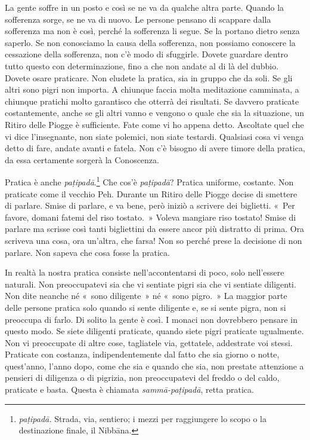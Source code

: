 La gente soffre in un posto e così se ne va da qualche altra parte.
Quando la sofferenza sorge, se ne va di nuovo. Le persone pensano di
scappare dalla sofferenza ma non è così, perché la sofferenza li segue.
Se la portano dietro senza saperlo. Se non conosciamo la causa della
sofferenza, non possiamo conoscere la cessazione della sofferenza, non
c'è modo di sfuggirle. Dovete guardare dentro tutto questo con
determinazione, fino a che non andate al di là del dubbio. Dovete osare
praticare. Non eludete la pratica, sia in gruppo che da soli. Se gli
altri sono pigri non importa. A chiunque faccia molta meditazione
camminata, a chiunque pratichi molto garantisco che otterrà dei
risultati. Se davvero praticate costantemente, anche se gli altri vanno
e vengono o quale che sia la situazione, un Ritiro delle Piogge è
sufficiente. Fate come vi ho appena detto. Ascoltate quel che vi dice
l'insegnante, non siate polemici, non siate testardi. Qualsiasi cosa vi
venga detto di fare, andate avanti e fatela. Non c'è bisogno di avere
timore della pratica, da essa certamente sorgerà la Conoscenza.

Pratica è anche \emph{paṭipadā}.\footnote{\emph{paṭipadā.} Strada, via,
  sentiero; i mezzi per raggiungere lo scopo o la destinazione finale,
  il Nibbāna.} Che cos'è \emph{paṭipadā}? Pratica uniforme,
costante. Non praticate come il vecchio Peh. Durante un Ritiro delle
Piogge decise di smettere di parlare. Smise di parlare, e va bene, però
iniziò a scrivere dei biglietti. «~Per favore, domani fatemi del riso
tostato.~» Voleva mangiare riso tostato! Smise di parlare ma scrisse
così tanti bigliettini da essere ancor più distratto di prima. Ora
scriveva una cosa, ora un'altra, che farsa! Non so perché prese la
decisione di non parlare. Non sapeva che cosa fosse la pratica.

In realtà la nostra pratica consiste nell'accontentarsi di poco, solo
nell'essere naturali. Non preoccupatevi sia che vi sentiate pigri sia
che vi sentiate diligenti. Non dite neanche né «~sono diligente~» né
«~sono pigro.~» La maggior parte delle persone pratica solo quando si
sente diligente e, se si sente pigra, non si preoccupa di farlo. Di
solito la gente è così. I monaci non dovrebbero pensare in questo modo.
Se siete diligenti praticate, quando siete pigri praticate ugualmente.
Non vi preoccupate di altre cose, tagliatele via, gettatele, addestrate
voi stessi. Praticate con costanza, indipendentemente dal fatto che sia
giorno o notte, quest'anno, l'anno dopo, come che sia e quando che sia,
non prestate attenzione a pensieri di diligenza o di pigrizia, non
preoccupatevi del freddo o del caldo, praticate e basta. Questa è
chiamata \emph{sammā-paṭipadā}, retta pratica.

